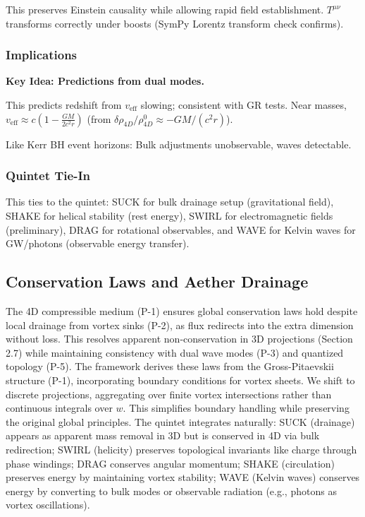 This preserves Einstein causality while allowing rapid field establishment. $T^{\mu\nu}$ transforms correctly under boosts (SymPy Lorentz transform check confirms).

\subsubsection{Implications}

\textbf{Key Idea: Predictions from dual modes.}

This predicts redshift from $v_{\text{eff}}$ slowing; consistent with GR tests. Near masses, $v_{\text{eff}} \approx c \left(1 - \frac{G M}{2 c^2 r}\right)$ (from $\delta \rho_{4D} / \rho_{4D}^0 \approx - G M / (c^2 r)$).

Like Kerr BH event horizons: Bulk adjustments unobservable, waves detectable.

\subsubsection{Quintet Tie-In}

This ties to the quintet: SUCK for bulk drainage setup (gravitational field), SHAKE for helical stability (rest energy), SWIRL for electromagnetic fields (preliminary), DRAG for rotational observables, and WAVE for Kelvin waves for GW/photons (observable energy transfer).


\subsection{Conservation Laws and Aether Drainage}

The 4D compressible medium (P-1) ensures global conservation laws hold despite local drainage from vortex sinks (P-2), as flux redirects into the extra dimension without loss. This resolves apparent non-conservation in 3D projections (Section 2.7) while maintaining consistency with dual wave modes (P-3) and quantized topology (P-5). The framework derives these laws from the Gross-Pitaevskii structure (P-1), incorporating boundary conditions for vortex sheets. We shift to discrete projections, aggregating over finite vortex intersections rather than continuous integrals over $w$. This simplifies boundary handling while preserving the original global principles. The quintet integrates naturally: SUCK (drainage) appears as apparent mass removal in 3D but is conserved in 4D via bulk redirection; SWIRL (helicity) preserves topological invariants like charge through phase windings; DRAG conserves angular momentum; SHAKE (circulation) preserves energy by maintaining vortex stability; WAVE (Kelvin waves) conserves energy by converting to bulk modes or observable radiation (e.g., photons as vortex oscillations).

